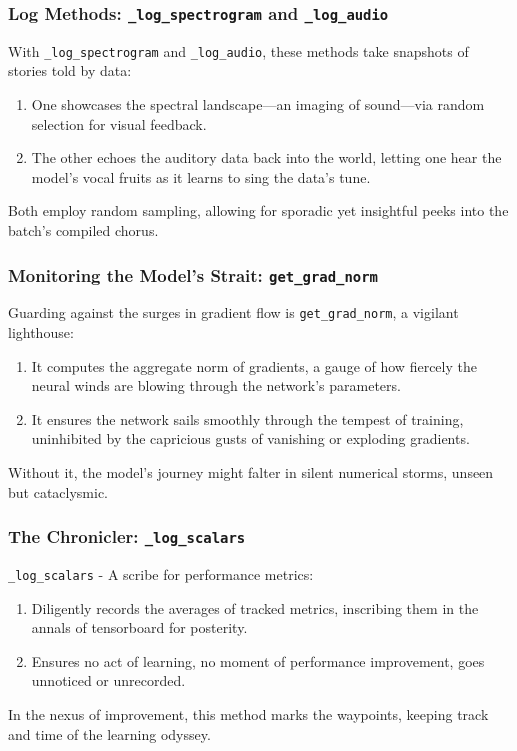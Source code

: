 \documentclass[a4paper]{article}
\begin{document}
\subsubsection{Log Methods: \texttt{\_log\_spectrogram} and \texttt{\_log\_audio}}
With \texttt{\_log\_spectrogram} and \texttt{\_log\_audio}, these methods take snapshots of stories told by data:
\begin{enumerate}
  \item One showcases the spectral landscape—an imaging of sound—via random selection for visual feedback.
  \item The other echoes the auditory data back into the world, letting one hear the model's vocal fruits as it learns to sing the data's tune.
\end{enumerate}
Both employ random sampling, allowing for sporadic yet insightful peeks into the batch's compiled chorus.

\subsubsection{Monitoring the Model's Strait: \texttt{get\_grad\_norm}}
Guarding against the surges in gradient flow is \texttt{get\_grad\_norm}, a vigilant lighthouse:
\begin{enumerate}
  \item It computes the aggregate norm of gradients, a gauge of how fiercely the neural winds are blowing through the network's parameters.
  \item It ensures the network sails smoothly through the tempest of training, uninhibited by the capricious gusts of vanishing or exploding gradients.
\end {enumerate}
Without it, the model's journey might falter in silent numerical storms, unseen but cataclysmic.

\subsubsection{The Chronicler: \texttt{\_log\_scalars}}
\texttt{\_log\_scalars} - A scribe for performance metrics:
\begin{enumerate}
  \item Diligently records the averages of tracked metrics, inscribing them in the annals of tensorboard for posterity.
  \item Ensures no act of learning, no moment of performance improvement, goes unnoticed or unrecorded.
\end{enumerate}
In the nexus of improvement, this method marks the waypoints, keeping track and time of the learning odyssey.
\end{document}
